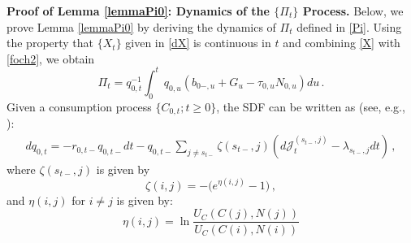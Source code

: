 \documentclass[12pt]{article}
\begin{document}
\noindent\textbf{Proof of Lemma \ref{lemmaPi0}: Dynamics of the $\{\Pi_t\}$ Process.}\quad 
Below, we prove Lemma \ref{lemmaPi0} by deriving the dynamics of $\Pi_t$ defined in \eqref{Pi}. 
Using the property that $\{X_t\}$ given in \eqref{dX} is continuous in $t$ and combining \eqref{X} with \eqref{foch2}, we obtain
\begin{equation}\label{Pi2}
\Pi_t=q_{0, t}^{-1} \int_{0}^t\, {q_{0, u}} \left(b_{0-, u} +G_u-\tau_{0, u} N_{0, u} \right)du\,.
\end{equation}
Given a consumption process $\{C_{0, t}; t\geq 0\}$, the SDF can be written  as  (see, e.g., \cite{duffie2010dynamic}): %
\begin{eqnarray}\label{sdfq2}
d q_{0, t} = - r^{}_{0, t-} q_{0, t-}dt  -  q_{0, t-}  \sum_{j\neq s_{t-}} \zeta(s_{t-}, j)\left(d {\mathcal J}_t^{(s_{t-}, j)} - \lambda_{s_{t-}, j} d t \right)\,,
\end{eqnarray}
where $ \zeta(s_{t-}, j)$ is given by
\begin{equation}
\zeta(i, j) = -\big(e^{\eta(i, j)}-1 \big)\,,
\end{equation}
and {$\eta(i,j)$ for  $i\neq j$} is given by: %
\begin{equation}\label{kappa} 
\eta(i, j)= \ln\frac{U_C(C(j), N(j))}{U_C(C(i), N(i))} \end{equation}
\end{document}
